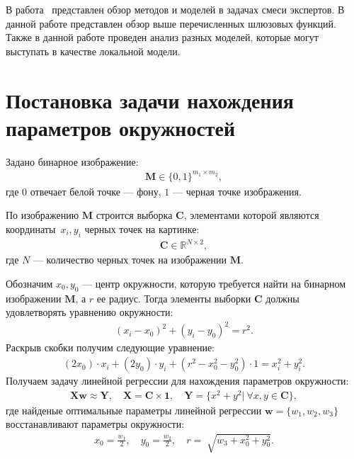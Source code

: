 \documentclass[12pt, twoside]{article}
\numberwithin{equation}{section}
\begin{document}
В работа~\cite{Yuksel2012} представлен обзор методов и моделей в задачах смеси экспертов. В данной работе представлен обзор выше перечисленных шлюзовых функций. Также в данной работе проведен анализ разных моделей, которые могут выступать в качестве локальной модели.


\section{Постановка задачи нахождения параметров окружностей}
Задано бинарное изображение:
\begin{equation}
\label{eq:st:cr:1}
\begin{aligned}
\textbf{M} \in \{0,1\}^{m_1 \times m_2},
\end{aligned}
\end{equation}
где $0$ отвечает белой точке --- фону, $1$ --- черная точке изображения.

По изображению $\textbf{M}$ строится выборка $\textbf{C}$, элементами которой являются координаты~$x_i, y_i$ черных точек на картинке:
\begin{equation}
\label{eq:st:cr:2}
\begin{aligned}
\textbf{C} \in  \mathbb{R}^{N \times 2},
\end{aligned}
\end{equation}
где $N$ --- количество черных точек на изображении $\textbf{M}$.

Обозначим $x_0, y_0$ --- центр окружности, которую требуется найти на бинарном изображении $\textbf{M}$, а $r$ ее радиус. Тогда элементы выборки $\textbf{C}$ должны удовлетворять уравнению окружности:
\begin{equation}
\label{eq:st:cr:3}
\begin{aligned}
\left(x_i - x_0\right)^{2}+\left(y_i-y_0\right)^2 = r^2.
\end{aligned}
\end{equation}
Раскрыв скобки получим следующие уравнение:
\begin{equation}
\label{eq:st:cr:4}
\begin{aligned}
(2x_0)\cdot x_i + (2y_0)\cdot y_i+(r^2-x_0^2-y_0^2)\cdot1 = x_{i}^2 + y_{i}^2.
\end{aligned}
\end{equation}
Получаем задачу линейной регрессии для нахождения параметров окружности:
\begin{equation}
\label{eq:st:cr:5}
\begin{aligned}
\textbf{X}\textbf{w} \approx \textbf{Y},  \quad \textbf{X} = \textbf{C}\times \textbf{1}, \quad \textbf{Y} = \{x^2+y^2|~\forall x,y \in \textbf{C}\},
\end{aligned}
\end{equation}
где найденые оптимальные параметры линейной регрессии $\textbf{w} = \{w_1, w_2, w_3\}$ восстанавливают параметры окружности:
\begin{equation}
\label{eq:st:cr:6}
\begin{aligned}
x_0 = \frac{w_1}{2}, \quad y_0 = \frac{w_2}{2}, \quad r = \sqrt[]{w_3+x_{0}^{2}+y_{0}^{2}}.
\end{aligned}
\end{equation}
\end{document}
